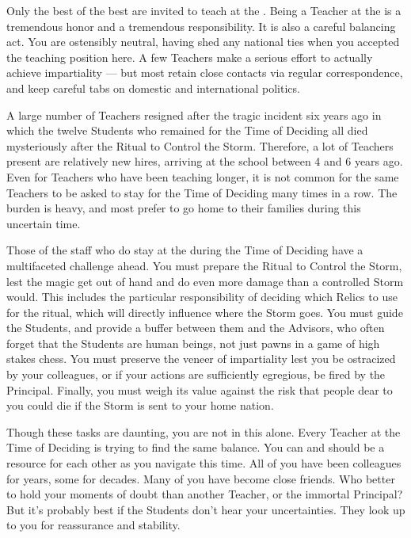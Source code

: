 \documentclass[blue]{GL2020}
\begin{document}
\name{\bTeacherBlue{}}

Only the best of the best are invited to teach at the \pSchool{}. Being a Teacher at the \pSc{} is a tremendous honor and a tremendous responsibility. It is also a careful balancing act. You are ostensibly neutral, having shed any national ties when you accepted the teaching position here. A few Teachers make a serious effort to actually achieve impartiality — but most retain close contacts via regular correspondence, and keep careful tabs on domestic and international politics.

A large number of Teachers resigned after the tragic incident six years ago in which the twelve Students who remained for the Time of Deciding all died mysteriously after the Ritual to Control the Storm. Therefore, a lot of Teachers present are relatively new hires, arriving at the school between 4 and 6 years ago. Even for Teachers who have been teaching longer, it is not common for the same Teachers to be asked to stay for the Time of Deciding many times in a row. The burden is heavy, and most prefer to go home to their families during this uncertain time.

Those of the staff who do stay at the \pSc{} during the Time of Deciding have a multifaceted challenge ahead. You must prepare the Ritual to Control the Storm, lest the magic get out of hand and do even more damage than a controlled Storm would. This includes the particular responsibility of deciding which Relics to use for the ritual, which will directly influence where the Storm goes. You must guide the Students, and provide a buffer between them and the Advisors, who often forget that the Students are human beings, not just pawns in a game of high stakes chess. You must preserve the veneer of impartiality lest you be ostracized by your colleagues, or if your actions are sufficiently egregious, be fired by the Principal. Finally, you must weigh its value against the risk that people dear to you could die if the Storm is sent to your home nation.

Though these tasks are daunting, you are not in this alone. Every Teacher at the Time of Deciding is trying to find the same balance. You can and should be a resource for each other as you navigate this time. All of you have been colleagues for years, some for decades. Many of you have become close friends. Who better to hold your moments of doubt than another Teacher, or the immortal Principal? But it's probably best if the Students don't hear your uncertainties. They look up to you for reassurance and stability.
\end{document}
